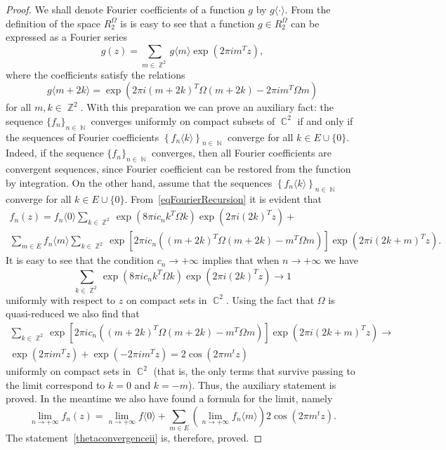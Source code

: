 \documentclass{amsart}
\numberwithin{equation}{section}
\theoremstyle{definition}
\theoremstyle{remark}
\DeclareMathOperator{\CC}{\mathbb C}
\DeclareMathOperator{\ZZ}{\mathbb Z}
\DeclareMathOperator{\NN}{\mathbb N}
\begin{document}
	\begin{proof}
		We shall denote Fourier coefficients of a function $g$ by $g\langle\cdot\rangle$. From the definition of the space $R_2^\Omega$ is is easy to see that a function $g \in R_2^\Omega$ can be expressed as a Fourier series
		\[
		g(z) = \sum_{m \in \ZZ^2}g\langle m\rangle \exp\left(2\pi i m^Tz\right),
		\]
		where the coefficients satisfy the relations
		\begin{equation}\label{eqFourierRecursion}
			g\langle m + 2k\rangle = \exp\left(2\pi i(m+ 2k)^T\Omega(m+ 2k) - 2\pi im^T\Omega m\right)
		\end{equation}
		for all $m,k \in \ZZ^2$. With this preparation we can prove an auxiliary fact: the sequence $\{f_n\}_{n \in \NN}$ converges uniformly on compact subsets of $\CC^2$ if and only if the sequences of Fourier coefficients $\left\{f_n\langle k\rangle \right\}_{n \in \NN}$ converge for all $k \in E \cup \{0\}$. Indeed, if the sequence $\{f_n\}_{n \in \NN}$ converges, then all Fourier coefficients are convergent sequences, since Fourier coefficient can be restored from the function by integration. On the other hand, assume that the sequences $\left\{f_n\langle k\rangle \right\}_{n \in \NN}$ converge for all $k \in E \cup \{0\}$. From~\eqref{eqFourierRecursion} it is evident that
		\begin{multline}\label{eqFourierExpansion}
			f_n(z) = f_n\langle 0\rangle\sum_{k \in \ZZ^2}\exp\left(8\pi ic_nk^T\Omega k\right)\exp\left(2\pi i (2k)^Tz\right) + \\ \sum_{m \in E} f_n\langle m\rangle \sum_{k \in \ZZ^2}\exp\left[2\pi ic_n\left((m+ 2k)^T\Omega(m+ 2k) - m^T\Omega m\right)\right]\exp(2\pi i(2k + m)^Tz).
		\end{multline}
		It is easy to see that the condition $c_n \to +\infty$ implies that when $n \to +\infty$ we have
		\[
		\sum_{k \in \ZZ^2}\exp\left(8\pi ic_nk^T\Omega k\right)\exp\left(2\pi i (2k)^Tz\right) \to 1
		\]
		uniformly with respect to $z$ on compact sets in $\CC^2$. Using the fact that $\Omega$ is quasi-reduced we also find that
		\begin{multline*}
			\sum_{k \in \ZZ^2}\exp\left[2\pi ic_n\left((m+ 2k)^T\Omega(m+ 2k) - m^T\Omega m\right)\right]\exp(2\pi i(2k + m)^Tz) \to \\ \exp(2\pi i m^Tz) + \exp(-2\pi i m^Tz) = 2\cos(2\pi m^tz)
		\end{multline*}
		uniformly on compact sets in $\CC^2$ (that is, the only terms that survive passing to the limit correspond to $k = 0$ and $k = -m$). Thus, the auxiliary statement is proved. In the meantime we also have found a formula for the limit, namely
		\[
		\lim_{n \to +\infty} f_n(z) = \lim_{n \to +\infty} f\langle 0\rangle  + \sum_{m \in E}\left(\lim_{n \to +\infty} f_n\langle m \rangle\right)2\cos(2\pi m^tz).
		\]
		The statement~\ref{thetaconvergenceii} is, therefore, proved.
		

\end{proof}
\end{document}
